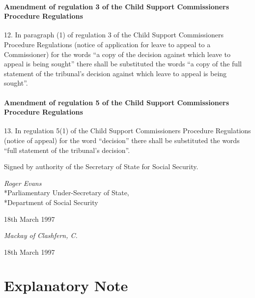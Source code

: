 \documentclass[12pt,a4paper]{article}
\begin{document}
\subsection[12. Amendment of regulation 3 of the Child Support Commissioners Procedure Regulations]{Amendment of regulation 3 of the Child Support Commissioners Procedure Regulations}

12.  In paragraph (1) of regulation 3 of the Child Support Commissioners Procedure Regulations (notice of application for leave to appeal to a Commissioner) for the words “a copy of the decision against which leave to appeal is being sought” there shall be substituted the words “a copy of the full statement of the tribunal’s decision against which leave to appeal is being sought”.

\subsection[13. Amendment of regulation 5 of the Child Support Commissioners Procedure Regulations]{Amendment of regulation 5 of the Child Support Commissioners Procedure Regulations}

13.  In regulation 5(1) of the Child Support Commissioners Procedure Regulations (notice of appeal) for the word “decision” there shall be substituted the words “full statement of the tribunal’s decision”.

\bigskip

Signed 
by authority of the Secretary of State for Social Security.

{\raggedleft
\emph{Roger Evans}\\*Parliamentary Under-Secretary of State,\\*Department of Social Security

}

18th March 1997

\bigskip


{\raggedleft
\emph{Mackay of Clashfern, C.}%

}

18th March 1997 

\small

\part{Explanatory Note}
\end{document}
